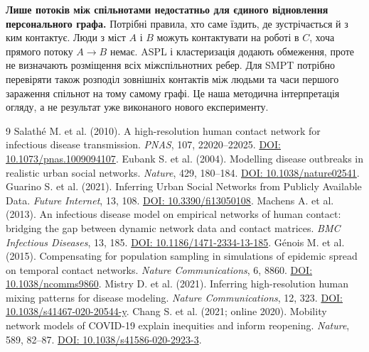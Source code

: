 \documentclass[11pt,a4paper]{article}
\begin{document}
\textbf{Лише потоків між спільнотами недостатньо для єдиного відновлення персонального графа.} Потрібні правила, хто саме їздить, де зустрічається й з ким контактує. Люди з міст $A$ і $B$ можуть контактувати на роботі в $C$, хоча прямого потоку $A\to B$ немає. ASPL і кластеризація додають обмеження, проте не визначають розміщення всіх міжспільнотних ребер. Для SMPT потрібно перевіряти також розподіл зовнішніх контактів між людьми та часи першого зараження спільнот на тому самому графі. Це наша методична інтерпретація огляду, а не результат уже виконаного нового експерименту.

\begin{thebibliography}{9}\footnotesize
\setlength{\itemsep}{1pt}\setlength{\parskip}{0pt}
 Salathé M. et al. (2010). A high-resolution human contact network for infectious disease transmission. \emph{PNAS}, 107, 22020--22025. \href{https://doi.org/10.1073/pnas.1009094107}{DOI: 10.1073/pnas.1009094107}.
 Eubank S. et al. (2004). Modelling disease outbreaks in realistic urban social networks. \emph{Nature}, 429, 180--184. \href{https://doi.org/10.1038/nature02541}{DOI: 10.1038/nature02541}.
 Guarino S. et al. (2021). Inferring Urban Social Networks from Publicly Available Data. \emph{Future Internet}, 13, 108. \href{https://doi.org/10.3390/fi13050108}{DOI: 10.3390/fi13050108}.
 Machens A. et al. (2013). An infectious disease model on empirical networks of human contact: bridging the gap between dynamic network data and contact matrices. \emph{BMC Infectious Diseases}, 13, 185. \href{https://doi.org/10.1186/1471-2334-13-185}{DOI: 10.1186/1471-2334-13-185}.
 Génois M. et al. (2015). Compensating for population sampling in simulations of epidemic spread on temporal contact networks. \emph{Nature Communications}, 6, 8860. \href{https://doi.org/10.1038/ncomms9860}{DOI: 10.1038/ncomms9860}.
 Mistry D. et al. (2021). Inferring high-resolution human mixing patterns for disease modeling. \emph{Nature Communications}, 12, 323. \href{https://doi.org/10.1038/s41467-020-20544-y}{DOI: 10.1038/s41467-020-20544-y}.
 Chang S. et al. (2021; online 2020). Mobility network models of COVID-19 explain inequities and inform reopening. \emph{Nature}, 589, 82--87. \href{https://doi.org/10.1038/s41586-020-2923-3}{DOI: 10.1038/s41586-020-2923-3}.
\end{thebibliography}
\end{document}
